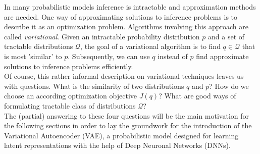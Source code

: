 \documentclass[12pt]{report}
\theoremstyle{definition}
\begin{document}
In many probabilistic models inference is intractable and approximation methods are needed. One way of approximating solutions to inference problems is to describe it as an optimization problem. Algorithms involving this approach are called \emph{variational}.
Given an intractable probability distribution $p$ and a set of tractable distributions $\mathcal{Q}$, the goal of a variational algorithm is to find $q \in \mathcal{Q}$ that is most 'similar' to $p$. Subsequently, we can use $q$ instead of $p$ find approximate solutions to inference problems efficiently.\\
Of course, this rather informal description on variational techniques leaves us with questions. What is the similarity of two distributions $q$ and $p$? How do we choose an according optimization objective $J(q)$? What are good ways of formulating tractable class of distributions $\mathcal{Q}$? \\
The (partial) answering to these four questions will be the main motivation for the following sections in order to lay the groundwork for the introduction of the Variational Autoencoder (VAE), a probabilistic model designed for learning latent representations with the help of Deep Neuronal Networks (DNNs).
\end{document}
